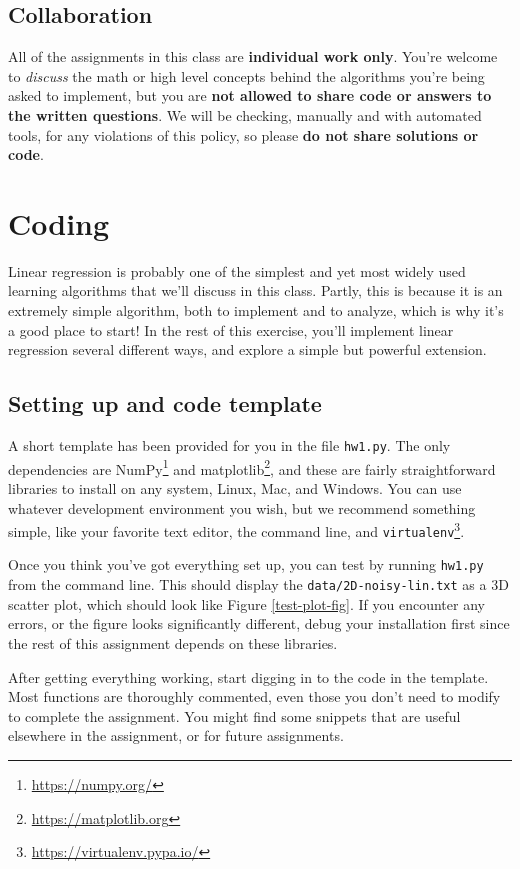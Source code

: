 \documentclass{article} %
\begin{document}
\subsection*{Collaboration}
All of the assignments in this class are \textbf{individual work only}. You're welcome to \emph{discuss} the math or high 
level concepts behind the algorithms you're being asked to implement, but you are 
\textbf{not allowed to share code or answers to the written questions}. We will be checking, manually and with automated 
tools, for any violations of this policy, so please \textbf{do not share solutions or code}.

\section*{Coding}
Linear regression is probably one of the simplest and yet most widely used learning algorithms that we'll discuss in this 
class. Partly, this is because it is an extremely simple algorithm, both to implement and to analyze, which is why it's a 
good place to start! In the rest of this exercise, you'll implement linear regression several different ways, and explore a 
simple but powerful extension.

\subsection*{Setting up and code template}
A short template has been provided for you in the file \texttt{hw1.py}. The only dependencies are 
NumPy\footnote{\url{https://numpy.org/}} and matplotlib\footnote{\url{https://matplotlib.org}}, and these are fairly 
straightforward libraries to install on any system, Linux, Mac, and Windows. You can use whatever development environment you 
wish, but we recommend something simple, like your favorite text editor, the command line, and 
\texttt{virtualenv}\footnote{\url{https://virtualenv.pypa.io/}}.

Once you think you've got everything set up, you can test by running \texttt{hw1.py} from the command line. This should 
display the \texttt{data/2D-noisy-lin.txt} as a 3D scatter plot, which should look like Figure \ref{test-plot-fig}. If you 
encounter any errors, or the figure looks significantly different, debug your installation first since the rest of this 
assignment depends on these libraries.

After getting everything working, start digging in to the code in the template. Most functions are thoroughly commented, even 
those you don't need to modify to complete the assignment. You might find some snippets that are useful elsewhere in the assignment, or for future assignments.
\end{document}
